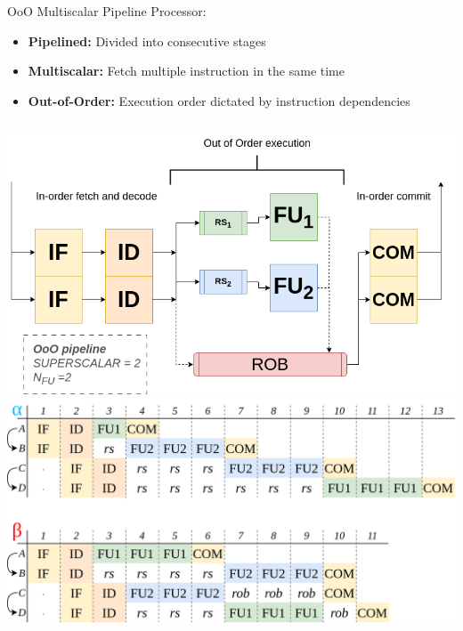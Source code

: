 \documentclass{beamer}
\begin{document}
\begin{frame}{OoO Multiscalar Pipeline}
    Processor:
    \begin{itemize}
        \item \textbf{Pipelined:} Divided into consecutive stages
        \item \textbf{Multiscalar:} Fetch multiple instruction in the same time
        \item \textbf{Out-of-Order:} Execution order dictated by instruction dependencies
    \end{itemize}


    \begin{columns}
        \includegraphics[width=\textwidth]{pic/ooo-pipeline.png}
        \includegraphics[width=\textwidth]{pic/multiscalar_ta.png}
    \end{columns}

\end{frame}

\end{document}
